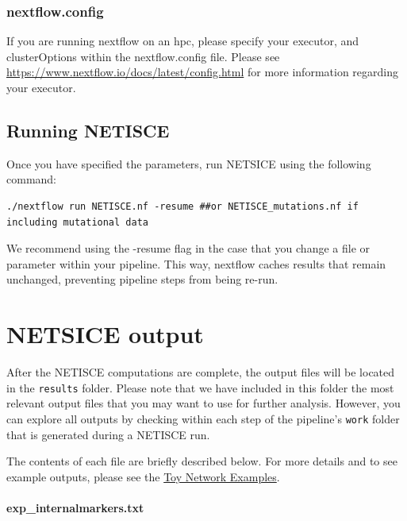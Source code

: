 \documentclass[
]{book}
\begin{document}
\hypertarget{nextflow.config}{%
\subsection{nextflow.config}\label{nextflow.config}}

If you are running nextflow on an hpc, please specify your executor, and clusterOptions within the nextflow.config file. Please see \url{https://www.nextflow.io/docs/latest/config.html} for more information regarding your executor.

\hypertarget{running-netisce}{%
\section{Running NETISCE}\label{running-netisce}}

Once you have specified the parameters, run NETSICE using the following command:

\begin{verbatim}
./nextflow run NETISCE.nf -resume ##or NETISCE_mutations.nf if including mutational data
\end{verbatim}

We recommend using the -resume flag in the case that you change a file or parameter within your pipeline. This way, nextflow caches results that remain unchanged, preventing pipeline steps from being re-run.

\hypertarget{netsice-output}{%
\chapter{NETSICE output}\label{netsice-output}}

After the NETISCE computations are complete, the output files will be located in the \texttt{results} folder. Please note that we have included in this folder the most relevant output files that you may want to use for further analysis. However, you can explore all outputs by checking within each step of the pipeline's \texttt{work} folder that is generated during a NETISCE run.

The contents of each file are briefly described below. For more details and to see example outputs, please see the \protect\hyperlink{toy}{Toy Network Examples}.

\hypertarget{section-id}{%
\subsubsection*{exp\_internalmarkers.txt}\label{section-id}}
\end{document}
